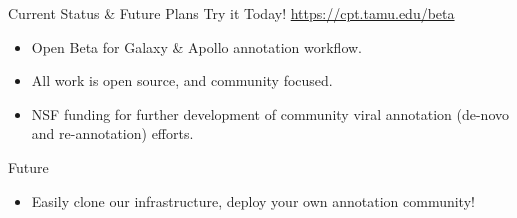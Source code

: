\documentclass[final,t,20pt]{beamer}
\begin{document}
\begin{frame}[fragile]
\begin{columns}[t]
\begin{column}{.36\linewidth}
            \begin{block}{Current Status \& Future Plans}
                Try it Today! \url{https://cpt.tamu.edu/beta}
                \begin{itemize}
                    \item Open Beta for Galaxy \& Apollo annotation workflow.
                    \item All work is open source, and community focused.
                    \item NSF funding for further development of community
                        viral annotation (de-novo and re-annotation) efforts.
                \end{itemize}
                Future
                \begin{itemize}
                    \item Easily clone our infrastructure, deploy your own
                        annotation community!
                \end{itemize}
            \end{block}


\end{column}
\end{columns}
\end{frame}
\end{document}
